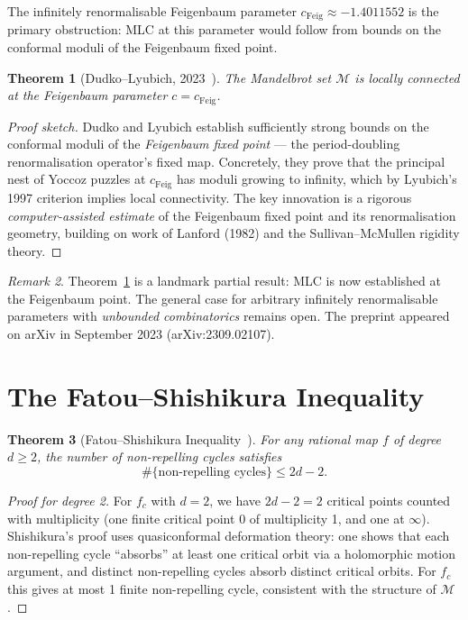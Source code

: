 \documentclass[12pt,a4paper]{amsart}
\newtheorem{theorem}{Theorem}[section]
\theoremstyle{definition}
\theoremstyle{remark}
\newtheorem{remark}[theorem]{Remark}
\begin{document}
The infinitely renormalisable Feigenbaum parameter $c_{\mathrm{Feig}} \approx -1.4011552$
is the primary obstruction: MLC at this parameter would follow from
bounds on the conformal moduli of the Feigenbaum fixed point.

\begin{theorem}[Dudko--Lyubich, 2023~\cite{DudkoLyubich2023}]
\label{thm:DudkoLyubich}
The Mandelbrot set $\mathcal{M}$ is locally connected at the
Feigenbaum parameter $c = c_{\mathrm{Feig}}$.
\end{theorem}

\begin{proof}[Proof sketch]
Dudko and Lyubich establish sufficiently strong bounds on the conformal
moduli of the \emph{Feigenbaum fixed point} — the period-doubling
renormalisation operator's fixed map.  Concretely, they prove that the
principal nest of Yoccoz puzzles at $c_{\mathrm{Feig}}$ has moduli
growing to infinity, which by Lyubich's 1997 criterion implies local
connectivity.  The key innovation is a rigorous \emph{computer-assisted
estimate} of the Feigenbaum fixed point and its renormalisation
geometry, building on work of Lanford (1982) and the Sullivan--McMullen
rigidity theory.
\end{proof}

\begin{remark}
Theorem~\ref{thm:DudkoLyubich} is a landmark partial result: MLC is now
established at the Feigenbaum point.  The general case for arbitrary
infinitely renormalisable parameters with \emph{unbounded combinatorics}
remains open.  The preprint appeared on arXiv in September 2023
(arXiv:2309.02107).
\end{remark}

\section{The Fatou--Shishikura Inequality}

\begin{theorem}[Fatou--Shishikura Inequality~\cite{Shishikura1987}]
For any rational map $f$ of degree $d \geq 2$, the number of
non-repelling cycles satisfies
\[
    \#\{\text{non-repelling cycles}\} \leq 2d - 2.
\]
\end{theorem}

\begin{proof}[Proof for degree 2]
For $f_c$ with $d=2$, we have $2d-2 = 2$ critical points counted with
multiplicity (one finite critical point $0$ of multiplicity 1, and one at
$\infty$). Shishikura's proof uses quasiconformal deformation theory: one
shows that each non-repelling cycle ``absorbs'' at least one critical orbit
via a holomorphic motion argument, and distinct non-repelling cycles absorb
distinct critical orbits. For $f_c$ this gives at most 1 finite non-repelling
cycle, consistent with the structure of $\mathcal{M}$.
\end{proof}
\end{document}
